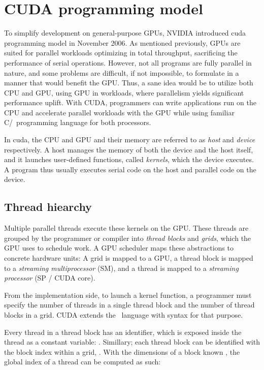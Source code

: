 \section{CUDA programming model} \label{label:cuda}

To simplify development on general-purpose GPUs, NVIDIA introduced \acrfull{cuda} programming model in November 2006. As mentioned previously, GPUs are suited for parallel workloads optimizing in total throughput, sacrificing the performance of serial operations. However, not all programs are fully parallel in nature, and some problems are difficult, if not impossible, to formulate in a manner that would benefit the GPU. Thus, a sane idea would be to utilize both CPU and GPU, using GPU in workloads, where parallelism yields significant performance uplift. With CUDA, programmers can write applications run on the CPU and accelerate parallel workloads with the GPU while using familiar C/\CC\ programming language for both processors.

In \acrshort{cuda}, the CPU and GPU and their memory are referred to as \textit{host} and \textit{device} respectively. A host manages the memory of both the device and the host itself, and it launches user-defined functions, called \textit{kernels}, which the device executes. A program thus usually executes serial code on the host and parallel code on the device.

\subsection{Thread hiearchy}

Multiple parallel threads execute these kernels on the GPU. These threads are grouped by the programmer or compiler into \textit{thread blocks} and \textit{grids}, which the GPU uses to schedule work. A GPU scheduler maps these abstractions to concrete hardware units: A grid is mapped to a GPU, a thread block is mapped to a \textit{streaming multiprocessor} (SM), and a thread is mapped to a \textit{streaming processor} (SP / CUDA core).

From the implementation side, to launch a kernel function, a programmer must specify the number of threads in a single thread block and the number of thread blocks in a grid. CUDA extends the \CC\ language with  syntax for that purpose.

Every thread in a thread block has an identifier, which is exposed inside the thread as a constant variable: . Simillary; each thread block can be identified with the block index within a grid, . With the dimensions of a block known , the global index of a thread can be computed as such:


